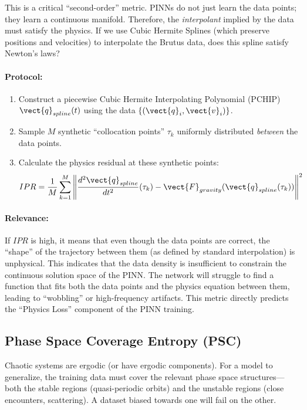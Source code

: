 This is a critical ``second-order'' metric. PINNs do not just learn the data points; they learn a continuous manifold. Therefore, the \textit{interpolant} implied by the data must satisfy the physics. If we use Cubic Hermite Splines (which preserve positions and velocities) to interpolate the Brutus data, does this spline satisfy Newton's laws?

\paragraph{Protocol:}
\begin{enumerate}
    \item Construct a piecewise Cubic Hermite Interpolating Polynomial (PCHIP) $\vect{q}_{spline}(t)$ using the data $\{(\vect{q}_i, \vect{v}_i)\}$.
    \item Sample $M$ synthetic ``collocation points'' $\tau_k$ uniformly distributed \textit{between} the data points.
    \item Calculate the physics residual at these synthetic points:
    \begin{equation}
        IPR = \frac{1}{M} \sum_{k=1}^{M} \left\| \frac{d^2 \vect{q}_{spline}}{dt^2}(\tau_k) - \vect{F}_{gravity}(\vect{q}_{spline}(\tau_k)) \right\|^2
    \end{equation}
\end{enumerate}

\paragraph{Relevance:}
If $IPR$ is high, it means that even though the data points are correct, the ``shape'' of the trajectory between them (as defined by standard interpolation) is unphysical. This indicates that the data density is insufficient to constrain the continuous solution space of the PINN. The network will struggle to find a function that fits both the data points and the physics equation between them, leading to ``wobbling'' or high-frequency artifacts. This metric directly predicts the ``Physics Loss'' component of the PINN training.

\subsection{Phase Space Coverage Entropy (PSC)}

Chaotic systems are ergodic (or have ergodic components). For a model to generalize, the training data must cover the relevant phase space structures—both the stable regions (quasi-periodic orbits) and the unstable regions (close encounters, scattering). A dataset biased towards one will fail on the other.

